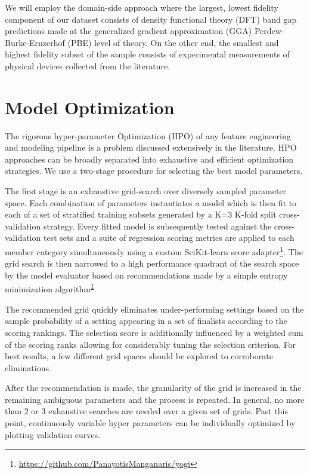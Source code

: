 We will employ the domain-side approach where the largest, lowest fidelity component of our dataset consists of density functional theory (DFT) band gap predictions made at the generalized gradient approximation (GGA) Perdew-Burke-Ernzerhof (PBE) level of theory.
On the other end, the smallest and highest fidelity subset of the sample consists of experimental measurements of physical devices collected from the literature.

\section{Model Optimization}
\label{sec:orgfb3950e}
The rigorous hyper-parameter Optimization (HPO) of any feature engineering and modeling pipeline is a problem discussed extensively in the literature.
HPO approaches can be broadly separated into exhaustive and efficient optimization strategies.
\autocite{yang-2020-hyper-optim}
We use a two-stage procedure for selecting the best model parameters.

The first stage is an exhaustive grid-search over diversely sampled parameter space.
Each combination of parameters instantiates a model which is then fit to each of a set of stratified training subsets generated by a K=3 K-fold split cross-validation strategy.
Every fitted model is subsequently tested against the cross-validation test sets and a suite of regression scoring metrics are applied to each member category simultaneously using a custom SciKit-learn score adapter\footnote{\url{https://github.com/PanayotisManganaris/yogi}\label{orgbdb51b8}}.
The grid search is then narrowed to a high performance quadrant of the search space by the model evaluator based on recommendations made by a simple entropy minimization algorithm\textsuperscript{\ref{orgbdb51b8}}.

The recommended grid quickly eliminates under-performing settings based on the sample probability of a setting appearing in a set of finalists according to the scoring rankings.
The selection score is additionally influenced by a weighted sum of the scoring ranks allowing for considerably tuning the selection criterion.
 For best results, a few different grid spaces should be explored to corroborate eliminations.

After the recommendation is made, the granularity of the grid is increased in the remaining ambiguous parameters and the process is repeated.
In general, no more than 2 or 3 exhaustive searches are needed over a given set of grids.
Past this point, continuously variable hyper parameters can be individually optimized by plotting validation curves.

